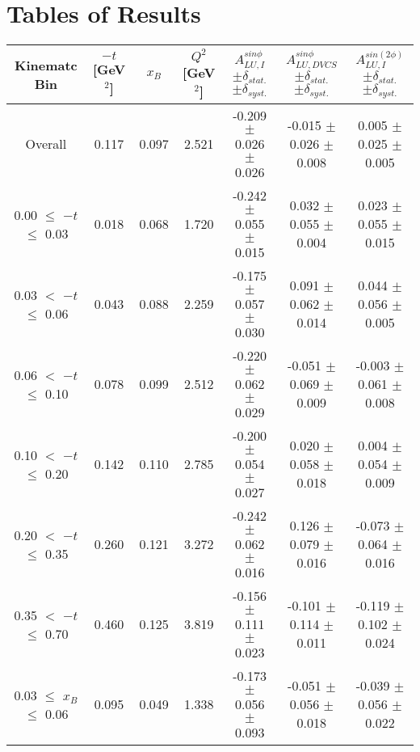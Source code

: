 \appendix
\setcounter{equation}{0}

\section{Tables of Results}


\begin{table}[width=15cm]
 \begin{center}
\resizebox{16cm}{!} {
  \begin{tabular}{|c|c|c|c|c|c|c|}
\hline
Kinematc Bin &  $-t$ [GeV$^{2}$] & $x_{B}$ & $Q^{2}$ [GeV$^{2}$] & 
$A^{sin \phi}_{LU,I}$ $\pm \delta_{stat.}$ $\pm \delta_{syst.}$ & $A^{sin \phi}_{LU,DVCS}$ $\pm \delta_{stat.}$ $\pm \delta_{syst.}$
& $A^{sin (2\phi)}_{LU,I}$ $\pm \delta_{stat.}$ $\pm \delta_{syst.}$ \\
\hline
\hline
Overall &  0.117 & 0.097 &  2.521 &  -0.209  $\pm$  0.026  $\pm$   0.026 &
 -0.015  $\pm$  0.026  $\pm$  0.008 & 0.005  $\pm$  0.025  $\pm$   0.005 \\
\hline
0.00 $\leqslant$ $-t$ $\leqslant$ 0.03 &  0.018 & 0.068 &  1.720 &  -0.242  $\pm$  0.055  $\pm$   0.015 &
 0.032  $\pm$  0.055   $\pm$  0.004 & 0.023  $\pm$  0.055  $\pm$   0.015\\
0.03 $<$ $-t$ $\leqslant$ 0.06 &  0.043 & 0.088 &  2.259&  -0.175 $\pm$   0.057   $\pm$  0.030 &
 0.091 $\pm$   0.062  $\pm$   0.014 & 0.044  $\pm$  0.056  $\pm$   0.005\\
0.06 $<$ $-t$ $\leqslant$ 0.10 &  0.078 & 0.099 &  2.512 & -0.220 $\pm$   0.062   $\pm$  0.029 &
 -0.051  $\pm$  0.069  $\pm$   0.009 & -0.003  $\pm$  0.061   $\pm$  0.008 \\
0.10 $<$ $-t$ $\leqslant$ 0.20 &  0.142 & 0.110 &  2.785 &  -0.200 $\pm$   0.054  $\pm$   0.027 &
0.020  $\pm$  0.058  $\pm$   0.018 & 0.004  $\pm$  0.054  $\pm$  0.009\\
0.20 $<$ $-t$ $\leqslant$ 0.35 &  0.260 & 0.121 &  3.272 &  -0.242 $\pm$   0.062  $\pm$   0.016 &
0.126  $\pm$  0.079  $\pm$   0.016 & -0.073 $\pm$   0.064   $\pm$  0.016\\
0.35 $<$ $-t$ $\leqslant$ 0.70 &  0.460 & 0.125 &  3.819 &  -0.156  $\pm$  0.111  $\pm$   0.023 & 
-0.101  $\pm$  0.114   $\pm$  0.011 & -0.119 $\pm$   0.102  $\pm$   0.024\\
\hline
0.03 $\leqslant$ $x_{B}$ $\leqslant$ 0.06 &  0.095 & 0.049 &  1.338 &  -0.173  $\pm$  0.056  $\pm$   0.093 &
-0.051 $\pm$   0.056  $\pm$   0.018 & -0.039  $\pm$  0.056  $\pm$   0.022\\

\end{tabular}}
\end{center}
\end{table}
